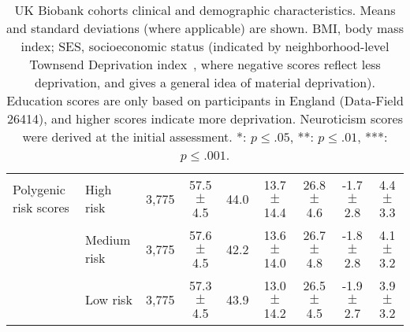 \begin{table*}[t]
{\begin{tabular}{ l | l | c | c | c | c | c | c | c}
        Polygenic risk scores               & High risk         & 3,775         & 57.5 $\pm$ 4.5    & 44.0              & 13.7 $\pm$ 14.4     & 26.8 $\pm$ 4.6    & -1.7 $\pm$ 2.8    & 4.4 $\pm$ 3.3 \\
                                            & Medium risk       & 3,775         & 57.6 $\pm$ 4.5    & 42.2              & 13.6 $\pm$ 14.0     & 26.7 $\pm$ 4.8    & -1.8 $\pm$ 2.8    & 4.1 $\pm$ 3.2 \\
                                            & Low risk          & 3,775         & 57.3 $\pm$ 4.5    & 43.9              & 13.0 $\pm$ 14.2     & 26.5 $\pm$ 4.5    & -1.9 $\pm$ 2.7    & 3.9 $\pm$ 3.2 \\
        \bottomrule
    \end{tabular}
  }
\caption{
    UK Biobank cohorts clinical and demographic characteristics.
    Means and standard deviations (where applicable) are shown.
    BMI, body mass index; SES, socioeconomic status (indicated by neighborhood-level Townsend Deprivation index~\parencite{Townsend1987}, where negative scores reflect less deprivation, and gives a general idea of material deprivation).
    Education scores are only based on participants in England (Data-Field 26414), and higher scores indicate more deprivation.
    Neuroticism scores were derived at the initial assessment.
    *: $p \leq .05$, **: $p \leq .01$, ***: $p \leq .001$.
}\label{tab:ukbiobank-cohorts}
\end{table*}
